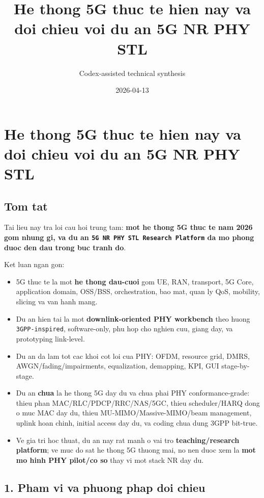 \documentclass[
  vietnamese,
  a4paper,
  11pt]{article}
\title{He thong 5G thuc te hien nay va doi chieu voi du an 5G NR PHY
STL}
\author{Codex-assisted technical synthesis}
\date{2026-04-13}
\providecommand{\tightlist}{%
  \setlength{\itemsep}{0pt}\setlength{\parskip}{0pt}}
\begin{document}
\maketitle

{
\setcounter{tocdepth}{3}
\tableofcontents
}
\section{He thong 5G thuc te hien nay va doi chieu voi du an 5G NR PHY
STL}\label{he-thong-5g-thuc-te-hien-nay-va-doi-chieu-voi-du-an-5g-nr-phy-stl}

\subsection{Tom tat}\label{tom-tat}

Tai lieu nay tra loi cau hoi trung tam: \textbf{mot he thong 5G thuc te
nam 2026 gom nhung gi, va du an
\texttt{5G\ NR\ PHY\ STL\ Research\ Platform} da mo phong duoc den dau
trong buc tranh do}.

Ket luan ngan gon:

\begin{itemize}
\tightlist
\item
  5G thuc te la mot \textbf{he thong dau-cuoi} gom UE, RAN, transport,
  5G Core, application domain, OSS/BSS, orchestration, bao mat, quan ly
  QoS, mobility, slicing va van hanh mang.
\item
  Du an hien tai la mot \textbf{downlink-oriented PHY workbench} theo
  huong \texttt{3GPP-inspired}, software-only, phu hop cho nghien cuu,
  giang day, va prototyping link-level.
\item
  Du an da lam tot cac khoi cot loi cua PHY: OFDM, resource grid, DMRS,
  AWGN/fading/impairments, equalization, demapping, KPI, GUI
  stage-by-stage.
\item
  Du an \textbf{chua} la he thong 5G day du va chua phai PHY
  conformance-grade: thieu phan MAC/RLC/PDCP/RRC/NAS/5GC, thieu
  scheduler/HARQ dong o muc MAC day du, thieu MU-MIMO/Massive-MIMO/beam
  management, uplink hoan chinh, initial access day du, va coding chua
  dung 3GPP bit-true.
\item
  Ve gia tri hoc thuat, du an nay rat manh o vai tro
  \textbf{teaching/research platform}; ve muc do sat he thong 5G thuong
  mai, no nen duoc xem la \textbf{mot mo hinh PHY pilot/co so} thay vi
  mot stack NR day du.
\end{itemize}

\subsection{1. Pham vi va phuong phap doi
chieu}\label{pham-vi-va-phuong-phap-doi-chieu}
\end{document}
